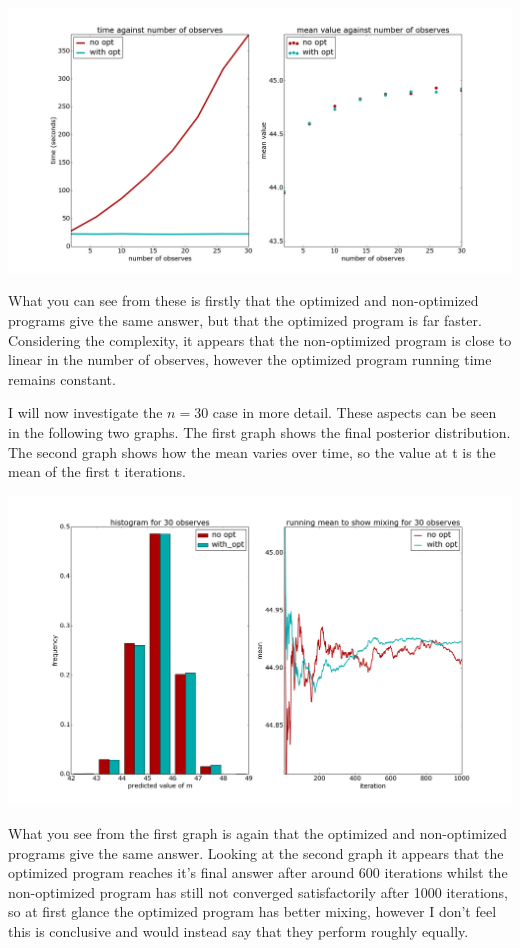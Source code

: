 \documentclass[a4paper]{article}
\begin{document}
\centerline{\includegraphics[width=16cm]{images/merging_observes_1.png}}

What you can see from these is firstly that the optimized and non-optimized programs give the same answer, but that the optimized program is far faster. Considering the complexity, it appears that the non-optimized program is close to linear in the number of observes, however the optimized program running time remains constant.

I will now investigate the \(n = 30\) case in more detail. These aspects can be seen in the following two graphs. The first graph shows the final posterior distribution. The second graph shows how the mean varies over time, so the value at t is the mean of the first t iterations.

\centerline{\includegraphics[width=16cm]{images/merging_observes_2.png}}

What you see from the first graph is again that the optimized and non-optimized programs give the same answer. Looking at the second graph it appears that the optimized program reaches it's final answer after around 600 iterations whilst the non-optimized program has still not converged satisfactorily after 1000 iterations, so at first glance the optimized program has better mixing, however I don't feel this is conclusive and would instead say that they perform roughly equally.
\end{document}
